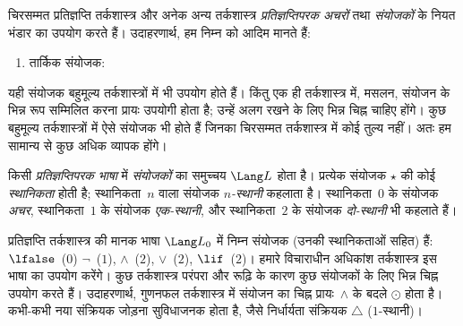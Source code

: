 \documentclass[../../../include/open-logic-section]{subfiles}
\begin{document}


चिरसम्मत प्रतिज्ञप्ति तर्कशास्त्र और अनेक अन्य तर्कशास्त्र
\emph{प्रतिज्ञप्तिपरक अचरों} तथा \emph{संयोजकों} के नियत भंडार का उपयोग
करते हैं। उदाहरणार्थ, हम निम्न को आदिम मानते हैं:
\begin{enumerate}
\item तार्किक संयोजक:
  \startycommalist
\end{enumerate}

यही संयोजक बहुमूल्य तर्कशास्त्रों में भी उपयोग होते हैं। किंतु एक ही
तर्कशास्त्र में, मसलन, संयोजन के भिन्न रूप सम्मिलित करना प्रायः उपयोगी
होता है; उन्हें अलग रखने के लिए भिन्न चिह्न चाहिए होंगे। कुछ बहुमूल्य
तर्कशास्त्रों में ऐसे संयोजक भी होते हैं जिनका चिरसम्मत तर्कशास्त्र में कोई
तुल्य नहीं। अतः हम सामान्य से कुछ अधिक व्यापक होंगे।

\begin{defn}
  किसी \emph{प्रतिज्ञप्तिपरक भाषा} में \emph{संयोजकों} का समुच्चय $\Lang
  L$ होता है। प्रत्येक संयोजक $\star$ की कोई \emph{स्थानिकता} होती है;
  स्थानिकता~$n$ वाला संयोजक \emph{$n$-स्थानी} कहलाता है। स्थानिकता~$0$ के
  संयोजक \emph{अचर}, स्थानिकता~$1$ के संयोजक \emph{एक-स्थानी}, और
  स्थानिकता~$2$ के संयोजक \emph{दो-स्थानी} भी कहलाते हैं।
\end{defn}

\begin{ex}
  प्रतिज्ञप्ति तर्कशास्त्र की मानक भाषा $\Lang L_0$ में निम्न संयोजक (उनकी
  स्थानिकताओं सहित) हैं:
  $\lfalse$~($0$)
  $\lnot$~($1$),
  $\land$~($2$),
  $\lor$~($2$),
  $\lif$~($2$)। हमारे विचाराधीन अधिकांश तर्कशास्त्र इस भाषा का उपयोग
  करेंगे। कुछ तर्कशास्त्र परंपरा और रूढ़ि के कारण कुछ संयोजकों के लिए भिन्न
  चिह्न उपयोग करते हैं। उदाहरणार्थ, गुणनफल तर्कशास्त्र में संयोजन का चिह्न
  प्रायः~$\land$ के बदले $\odot$ होता है। कभी-कभी नया संक्रियक जोड़ना
  सुविधाजनक होता है, जैसे निर्धार्यता संक्रियक $\triangle$ ($1$-स्थानी)।
\end{ex}
\end{document}
